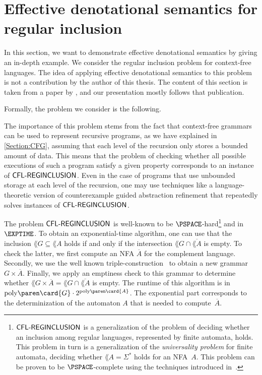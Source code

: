 \documentclass[../../diss.tex]{subfiles}
\begin{document}
\section{Effective denotational semantics for regular inclusion}%
\label{Section:EDSRegIncl}%

In this section, we want to demonstrate effective denotational semantics by giving an in-depth example.
We consider the regular inclusion problem for context-free languages.
The idea of applying effective denotational semantics to this problem is not a contribution by the author of this thesis.
The content of this section is taken from a paper by , and our presentation mostly follows that publication.

Formally, the problem we consider is the following.

\begin{problem}
    \problemshort{($\CFLINREG$)}
\end{problem}

The importance of this problem stems from the fact that context-free grammars can be used to represent recursive programs, as we have explained in \cref{Section:CFG}, assuming that each level of the recursion only stores a bounded amount of data.
This means that the problem of checking whether all possible executions of such a program satisfy a given property corresponds to an instance of $\CFLINREG$.
Even in the case of programs that use unbounded storage at each level of the recursion, one may use  techniques like a language-theoretic version of counterexample guided abstraction refinement that repeatedly solves instances of $\CFLINREG$.

The problem $\CFLINREG$ is well-known to be $\PSPACE$-hard\footnote{$\CFLINREG$ is a generalization of the problem of deciding whether an inclusion among regular languages, represented by finite automata, holds. This problem in turn is a generalization of the \emph{universality problem} for finite automata, \ie deciding whether $\lang{A} = \Sigma^*$ holds for an NFA~$A$. This problem can be proven to be $\PSPACE$-complete using the techniques introduced in~\cite{StockmeyerM73}.} and in $\EXPTIME$.
To obtain an exponential-time algorithm, one can use that the inclusion $\lang{G} \subseteq \lang{A}$ holds if and only if the intersection $\lang{G} \cap \overline{\lang{A}}$ is empty.
To check the latter, we first compute an NFA $\overline{A}$ for the complement language.
Secondly, we use the well known triple-construction~\cite{BarHillel61} to obtain a new grammar $G \times \overline{A}$.
Finally, we apply an emptiness check to this grammar to determine whether $\lang{G \times \overline{A}} = \lang{G} \cap \overline{\lang{A}}$ is empty.
The runtime of this algorithm is in $\poly{\card{G}} \cdot 2^{\poly{\card{A}}}$.
The exponential part corresponds to the determinization of the automaton $A$ that is needed to compute~$\overline{A}$.
\end{document}
